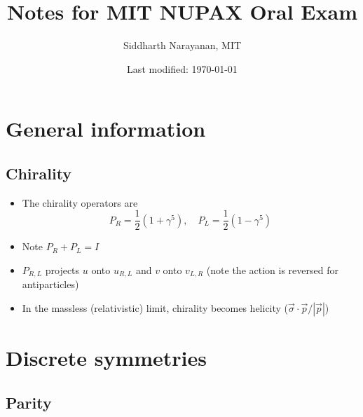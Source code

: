 

\pagestyle{fancy}
\chead{\today}
\setcounter{section}{-1}


\title{Notes for MIT NUPAX Oral Exam}
\date{Last modified: \today}
\author{Siddharth Narayanan, MIT}

\maketitle

\tableofcontents

\section{General information}
\subsection{Chirality}
\begin{itemize}
  \item The chirality operators are
  \begin{equation}
    P_R = \frac{1}{2} \left(1+\gamma^5\right), \quad P_L = \frac{1}{2} \left(1-\gamma^5\right)
  \end{equation}
  \item Note $P_R+P_L = I$
  \item $P_{R,L}$ projects $u$ onto $u_{R,L}$ and $v$ onto $v_{L,R}$ (note the action is reversed for antiparticles)
  \item In the massless (relativistic) limit, chirality becomes helicity ($\vec\sigma \cdot \vec p / |\vec p|$)
\end{itemize}

\section{Discrete symmetries}
\subsection{Parity}

